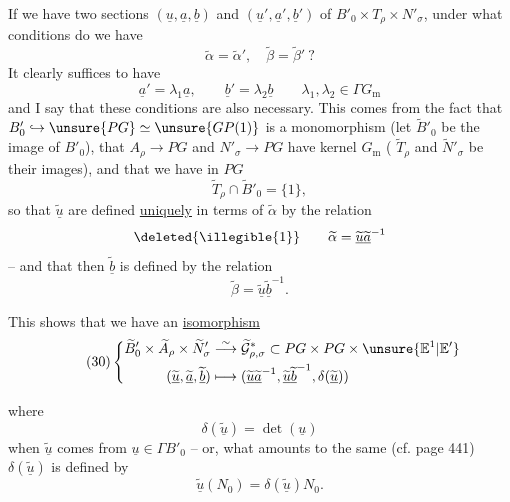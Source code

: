 
If we have two sections $(\underline u,\underline a,\underline b)$ and
$(\underline u',\underline a',\underline b')$ of
$B'_0\times T_\rho\times N'_\sigma$, under what
conditions do we have
\[
\tag{27}
\widetilde\alpha=\widetilde\alpha',\quad
\widetilde\beta=\widetilde\beta'\ ?
\]
It clearly suffices to have
\[
\tag{28}
\underline a'=\lambda_1\underline a,\qquad
\underline b'=\lambda_2\underline b
\qquad \lambda_1,\lambda_2\in\Gamma G_{\mathrm m}
\]
and I say that these conditions are also necessary.
This comes from the fact that
$B'_0\hookrightarrow\unsure{PG}\simeq\unsure{GP(1)}$
is a monomorphism (let $\widetilde B'_0$ be the image of $B'_0$),
that  $A_\rho\to PG$ and
$N'_\sigma\longrightarrow PG$ have kernel $G_{\mathrm m}$
( $\widetilde T_\rho$ and $\widetilde N'_\sigma$ be their images),
and that we have in $PG$
\[
\tag{29}
\widetilde T_\rho\cap\widetilde B'_0=\{1\},
\]
so that  $\widetilde{\underline u}$
are defined \uline{uniquely} in terms of $\widetilde\alpha$
by the relation
\[
\deleted{\illegible{1}}\qquad
\widetilde\alpha=\widetilde{\underline u}\widetilde{\underline a}^{-1}
\]
-- and that then $\widetilde{\underline b}$ is defined
by the relation
\[
\widetilde\beta=\widetilde{\underline u}\widetilde{\underline b}^{-1}.
\]

This shows that  we have an \uline{isomorphism}
\[
\tag{30}
\left\{\begin{aligned}
\widetilde B'_0\times\widetilde A_\rho\times\widetilde N'_\sigma
&\overset{\sim}{\longrightarrow}
\widetilde{\mathcal G}^{*}_{\rho,\sigma}
\subset PG\times PG\times\unsure{\mathbb E^1|\mathbb E'}\\
(\widetilde{\underline u},\widetilde{\underline a},\widetilde{\underline b})
&\longmapsto
(\widetilde{\underline u}\widetilde{\underline a}^{-1},
\widetilde{\underline u}\widetilde{\underline b}^{-1},
\delta(\widetilde{\underline u}))
\end{aligned}\right.
\]


where
\[
\tag{31}
\delta(\widetilde{\underline u})=\det(\underline u)
\]
when $\widetilde{\underline u}$ comes from $\underline u\in\Gamma B'_0$ --
or, what amounts to the same (cf. page 441)
$\delta(\widetilde{\underline u})$ is defined by
\[
\tag{32}
\widetilde{\underline u}(N_0)=\delta(\widetilde{\underline u})N_0.
\]

